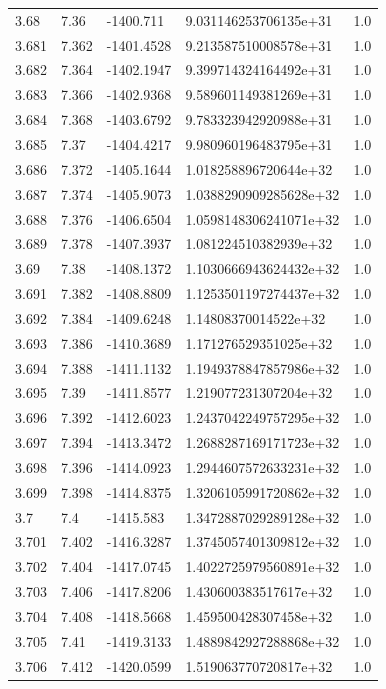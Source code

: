 \begin{tabular}{lllll}
3.68 & 7.36 & -1400.711 & 9.031146253706135e+31 & 1.0 \\
3.681 & 7.362 & -1401.4528 & 9.213587510008578e+31 & 1.0 \\
3.682 & 7.364 & -1402.1947 & 9.399714324164492e+31 & 1.0 \\
3.683 & 7.366 & -1402.9368 & 9.589601149381269e+31 & 1.0 \\
3.684 & 7.368 & -1403.6792 & 9.783323942920988e+31 & 1.0 \\
3.685 & 7.37 & -1404.4217 & 9.980960196483795e+31 & 1.0 \\
3.686 & 7.372 & -1405.1644 & 1.018258896720644e+32 & 1.0 \\
3.687 & 7.374 & -1405.9073 & 1.0388290909285628e+32 & 1.0 \\
3.688 & 7.376 & -1406.6504 & 1.0598148306241071e+32 & 1.0 \\
3.689 & 7.378 & -1407.3937 & 1.081224510382939e+32 & 1.0 \\
3.69 & 7.38 & -1408.1372 & 1.1030666943624432e+32 & 1.0 \\
3.691 & 7.382 & -1408.8809 & 1.1253501197274437e+32 & 1.0 \\
3.692 & 7.384 & -1409.6248 & 1.14808370014522e+32 & 1.0 \\
3.693 & 7.386 & -1410.3689 & 1.171276529351025e+32 & 1.0 \\
3.694 & 7.388 & -1411.1132 & 1.1949378847857986e+32 & 1.0 \\
3.695 & 7.39 & -1411.8577 & 1.219077231307204e+32 & 1.0 \\
3.696 & 7.392 & -1412.6023 & 1.2437042249757295e+32 & 1.0 \\
3.697 & 7.394 & -1413.3472 & 1.2688287169171723e+32 & 1.0 \\
3.698 & 7.396 & -1414.0923 & 1.2944607572633231e+32 & 1.0 \\
3.699 & 7.398 & -1414.8375 & 1.3206105991720862e+32 & 1.0 \\
3.7 & 7.4 & -1415.583 & 1.3472887029289128e+32 & 1.0 \\
3.701 & 7.402 & -1416.3287 & 1.3745057401309812e+32 & 1.0 \\
3.702 & 7.404 & -1417.0745 & 1.4022725979560891e+32 & 1.0 \\
3.703 & 7.406 & -1417.8206 & 1.430600383517617e+32 & 1.0 \\
3.704 & 7.408 & -1418.5668 & 1.459500428307458e+32 & 1.0 \\
3.705 & 7.41 & -1419.3133 & 1.4889842927288868e+32 & 1.0 \\
3.706 & 7.412 & -1420.0599 & 1.519063770720817e+32 & 1.0 \\

\end{tabular}
